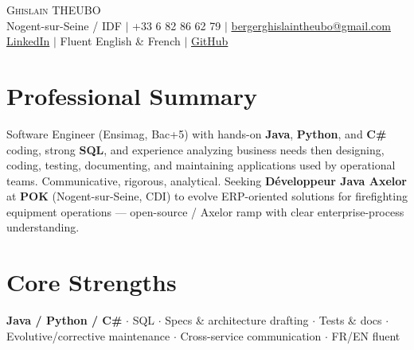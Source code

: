 \documentclass[letterpaper,10.5pt]{article}
\begin{document}
\begin{center}
{\Huge \scshape Ghislain THEUBO} \\ \vspace{2pt}
\small Nogent-sur-Seine / IDF $|$ +33 6 82 86 62 79 $|$ \href{mailto:bergerghislaintheubo@gmail.com}{bergerghislaintheubo@gmail.com} \\
\href{https://www.linkedin.com/in/berger-ghislain}{LinkedIn} $|$ Fluent English \& French $|$ \href{https://github.com/Bergerghislain}{GitHub}
\end{center}
\vspace{-6pt}
\section{Professional Summary}
\small{Software Engineer (Ensimag, Bac+5) with hands-on \textbf{Java}, \textbf{Python}, and \textbf{C\#} coding, strong \textbf{SQL}, and experience analyzing business needs then designing, coding, testing, documenting, and maintaining applications used by operational teams. Communicative, rigorous, analytical. Seeking \textbf{D\'eveloppeur Java Axelor} at \textbf{POK} (Nogent-sur-Seine, CDI) to evolve ERP-oriented solutions for firefighting equipment operations --- open-source / Axelor ramp with clear enterprise-process understanding.}
\section{Core Strengths}
\small{\textbf{Java / Python / C\#} $\cdot$ SQL $\cdot$ Specs \& architecture drafting $\cdot$ Tests \& docs $\cdot$ Evolutive/corrective maintenance $\cdot$ Cross-service communication $\cdot$ FR/EN fluent}
\end{document}
